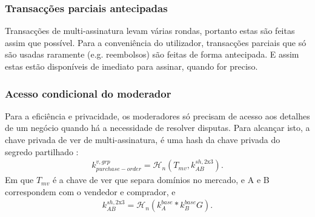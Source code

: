 \subsubsection*{Transacções parciais antecipadas}

Transacções de multi-assinatura levam várias rondas, portanto estas são feitas assim que possível. Para a conveniência do utilizador, transacções parciais que só são usadas raramente (e.g. reembolsos) são feitas de forma antecipada. E assim estas estão disponíveis de imediato para assinar, quando for preciso.  

\subsubsection*{Acesso condicional do moderador}

Para a eficiência e privacidade, os moderadores só precisam de acesso aos detalhes de um negócio quando há a necessidade de resolver disputas. Para alcançar isto, a chave privada de ver de multi-assinatura, é uma hash da chave privada do segredo partilhado :
\begin{align*}
k^{v,grp}_{purchase-order} = \mathcal{H}_n(T_{mv},k^{sh,\textrm{2x3}}_{AB}) .
\end{align*}    
Em que $T_{mv}$ é a chave de ver que separa domínios no mercado, e A e B correspondem com o vendedor e comprador, e   
\begin{align*}
k^{sh,\textrm{2x3}}_{AB} = \mathcal{H}_n(k^{base}_{A}*k^{base}_{B} G) .
\end{align*}


